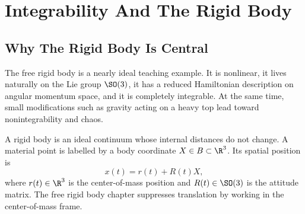 \chapter{Integrability And The Rigid Body}
\label{chap:rigid-integrability}

\section{Why The Rigid Body Is Central}
\label{sec:rigid-why-central}

The free rigid body is a nearly ideal teaching example. It is nonlinear, it
lives naturally on the Lie group \(\SO(3)\), it has a reduced Hamiltonian
description on angular momentum space, and it is completely integrable. At the
same time, small modifications such as gravity acting on a heavy top lead toward
nonintegrability and chaos.

\begin{assumption}
A rigid body is an ideal continuum whose internal distances do not change. A
material point is labelled by a body coordinate \(X\in B\subset\R^3\). Its
spatial position is
\[
  x(t)=r(t)+R(t)X,
\]
where \(r(t)\in\R^3\) is the center-of-mass position and
\(R(t)\in\SO(3)\) is the attitude matrix. The free rigid body chapter suppresses
translation by working in the center-of-mass frame.
\end{assumption}

